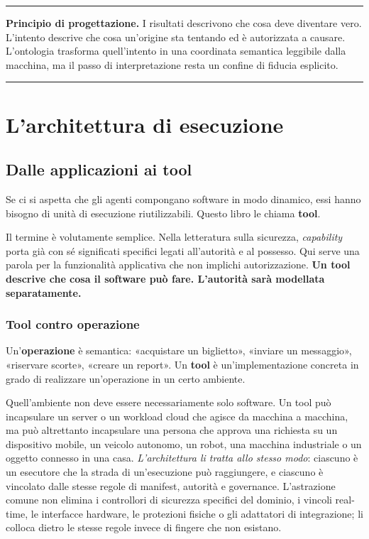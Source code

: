 \documentclass[10pt,oneside,openany]{book}
\newcommand{\term}[1]{\textbf{#1}}
\newcommand{\principle}[1]{%
  \vspace{4pt}
  \noindent\begin{minipage}{\linewidth}
  \hrule\vspace{5pt}
  \small\sffamily\raggedright\textbf{Principio di progettazione.} #1
  \vspace{5pt}\hrule
  \end{minipage}\vspace{4pt}
}
\begin{document}
\principle{I risultati descrivono che cosa deve diventare vero. L'intento descrive che cosa un'origine sta tentando ed è autorizzata a causare. L'ontologia trasforma quell'intento in una coordinata semantica leggibile dalla macchina, ma il passo di interpretazione resta un confine di fiducia esplicito.}


\part{L'architettura di esecuzione}

\chapter{Dalle applicazioni ai tool}

Se ci si aspetta che gli agenti compongano software in modo dinamico, essi hanno bisogno di unità di esecuzione riutilizzabili. Questo libro le chiama \term{tool}.

Il termine è volutamente semplice. Nella letteratura sulla sicurezza, \emph{capability} porta già con sé significati specifici legati all'autorità e al possesso. Qui serve una parola per la funzionalità applicativa che non implichi autorizzazione. \textbf{Un tool descrive che cosa il software può fare. L'autorità sarà modellata separatamente.}

\section{Tool contro operazione}
Un'\term{operazione} è semantica: «acquistare un biglietto», «inviare un messaggio», «riservare scorte», «creare un report». Un \term{tool} è un'implementazione concreta in grado di realizzare un'operazione in un certo ambiente.

Quell'ambiente non deve essere necessariamente solo software. Un tool può incapsulare un server o un workload cloud che agisce da macchina a macchina, ma può altrettanto incapsulare una persona che approva una richiesta su un dispositivo mobile, un veicolo autonomo, un robot, una macchina industriale o un oggetto connesso in una casa. \emph{L'architettura li tratta allo stesso modo}: ciascuno è un esecutore che la strada di un'esecuzione può raggiungere, e ciascuno è vincolato dalle stesse regole di manifest, autorità e governance. L'astrazione comune non elimina i controllori di sicurezza specifici del dominio, i vincoli real-time, le interfacce hardware, le protezioni fisiche o gli adattatori di integrazione; li colloca dietro le stesse regole invece di fingere che non esistano.
\end{document}
